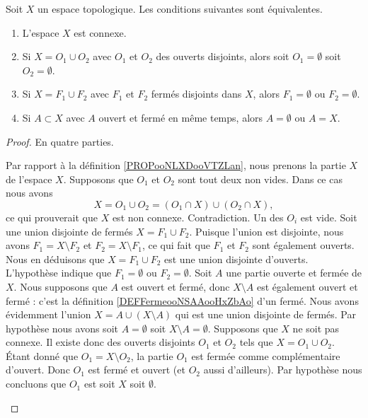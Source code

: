 \begin{proposition} \label{PropHSjJcIr}
	Soit \( X\) un espace topologique. Les conditions suivantes sont équivalentes.
	\begin{enumerate}
		\item       \label{ITEMooXHIKooGqrgTs}
		      L'espace \( X\) est connexe.
		\item       \label{ITEMooRTNPooADKVnw}
		      Si \( X=O_1\cup O_2\) avec \( O_1\) et \( O_2\) des ouverts disjoints, alors soit \( O_1=\emptyset\) soit \( O_2=\emptyset\).
		\item       \label{ITEMooOEZYooFBNaOZ}
		      Si \( X=F_1\cup F_2\) avec \( F_1\) et \( F_2\) fermés disjoints dans \( X\), alors \( F_1=\emptyset\) ou \( F_2=\emptyset\).
		\item       \label{ITEMooNIPZooIDPmEf}
		      Si \( A\subset X\) avec \( A\) ouvert et fermé en même temps, alors \( A=\emptyset\) ou \( A=X\).
	\end{enumerate}
\end{proposition}

\begin{proof}
	En quatre parties.
	\begin{subproof}
		Par rapport à la définition \ref{PROPooNLXDooVTZLan}, nous prenons la partie \( X\) de l'espace \( X\). Supposons que \( O_1\) et \( O_2\) sont tout deux non vides. Dans ce cas nous avons
		\begin{equation}
			X= O_1\cup O_2 = (O_1\cap X)\cup (O_2\cap X),
		\end{equation}
		ce qui prouverait que \( X\) est non connexe. Contradiction. Un des \( O_i\) est vide.
		Soit une union disjointe de fermés \( X=F_1\cup F_2\). Puisque l'union est disjointe, nous avons \( F_1=X\setminus F_2\) et \( F_2=X\setminus F_1\), ce qui fait que \( F_1\) et \( F_2\) sont également ouverts. Nous en déduisons que \( X=F_1\cup F_2\) est une union disjointe d'ouverts. L'hypothèse indique que \( F_1=\emptyset\) ou \( F_2=\emptyset\).
		Soit \( A\) une partie ouverte et fermée de \( X\). Nous supposons que \( A\) est ouvert et fermé, donc \( X\setminus A\) est également ouvert et fermé : c'est la définition \ref{DEFFermeooNSAAooHxZbAo} d'un fermé. Nous avons évidemment l'union \( X=A\cup(X\setminus A)\) qui est une union disjointe de fermés. Par hypothèse nous avons soit \( A=\emptyset\) soit \( X\setminus A=\emptyset\).
		Supposons que \( X\) ne soit pas connexe. Il existe donc des ouverts disjoints \( O_1\) et \( O_2\) tels que \( X=O_1\cup O_2\). Étant donné que \( O_1=X\setminus O_2\), la partie \( O_1\) est fermée comme complémentaire d'ouvert. Donc \( O_1\) est fermé et ouvert (et \( O_2\) aussi d'ailleurs). Par hypothèse nous concluons que \( O_1\) est soit \( X\) soit \( \emptyset\).
	\end{subproof}
\end{proof}

